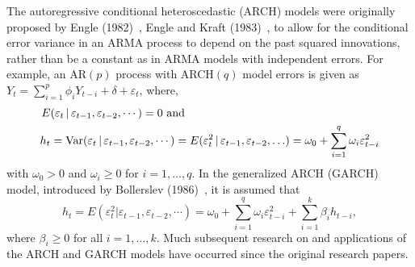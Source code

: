 The autoregressive conditional heteroscedastic (ARCH) models were originally proposed by Engle (1982)~\cite{engle1982}, Engle and Kraft (1983)~\cite{engle1983}, to allow for the conditional error variance in an ARMA process to depend on the past squared innovations, rather than be a constant as in ARMA models with independent errors. For example, an AR$(p)$ process with ARCH$(q)$ model errors is given as $Y_t = \sum_{i=1}^p\phi_iY_{t-i} + \delta + \varepsilon_t$, where,
	\begin{equation}\label{eqn:2ht}
	\begin{split}
	E&(\varepsilon_t\,|\,\varepsilon_{t-1},\varepsilon_{t-2},\cdots)= 0 \text{ and} \\
	h_t&= \Var(\varepsilon_t \,|\, \varepsilon_{t-1},\varepsilon_{t-2},\cdots) = E(\varepsilon_t^2\,|\,\varepsilon_{t-1},\varepsilon_{t-2},\ldots) = \omega_0 + \sum_{i=1}^q\omega_i\varepsilon_{t-i}^2
	\end{split}
	\end{equation}
with $\omega_0 > 0$ and $\omega_i \geq 0$ for $i= 1,\ldots,q$. In the generalized ARCH (GARCH) model, introduced by Bollerslev (1986)~\cite{bollerslev1986}, it is assumed that
	\begin{equation}\label{eqn:2secondht}
	h_t = E(\varepsilon_t^2|\varepsilon_{t-1},\varepsilon_{t-2},\cdots) = \omega_0 + \sum_{i=1}^q\omega_i\varepsilon_{t-i}^2 + \sum_{i=1}^k\beta_ih_{t-i},
	\end{equation}
where $\beta_i \geq 0$ for all $i = 1,\ldots,k$. Much subsequent research on and applications of the ARCH and GARCH models have occurred since the original research papers.


